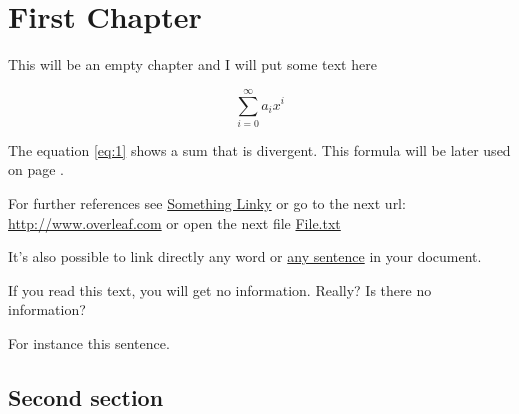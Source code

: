 \documentclass{book}
\begin{document}
\tableofcontents

\chapter{First Chapter}

This will be an empty chapter and I will put some text here

\begin{equation}
\label{eq:1}
\sum_{i=0}^{\infty} a_i x^i
\end{equation}

The equation \ref{eq:1} shows a sum that is divergent. This formula will be later used on page \pageref{second}.

For further references see \href{http://www.overleaf.com}{Something Linky} or go to the next url: \url{http://www.overleaf.com} or open the next file \href{run:./file.txt}{File.txt}

It's also possible to link directly any word or \hyperlink{thesentence}{any sentence} in your document.

If you read this text, you will get no information.  Really?  Is there no information?

For instance \hypertarget{thesentence}{this sentence}.

\Blindtext
\clearpage
\section{Second section} \label{second}
\blindtext
\Blinddocument
\end{document}
